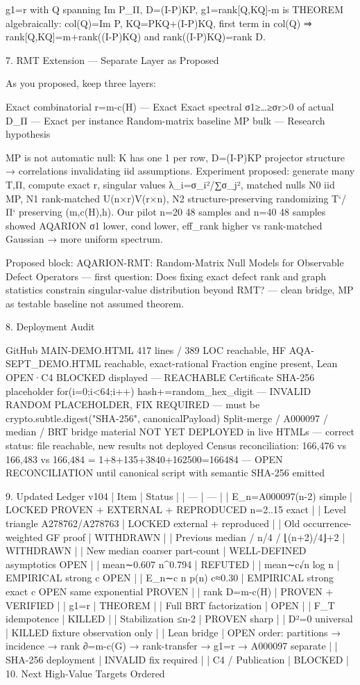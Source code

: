 g1=r with Q spanning Im P_Π, D=(I-P)KP, g1=rank[Q,KQ]-m is THEOREM algebraically: col(Q)=Im P, KQ=PKQ+(I-P)KQ, first term in col(Q) ⇒ rank[Q,KQ]=m+rank((I-P)KQ) and rank((I-P)KQ)=rank D.

7. RMT Extension — Separate Layer as Proposed

As you proposed, keep three layers:

Exact combinatorial r=m-c(H) — Exact
Exact spectral σ1≥…≥σr>0 of actual D_Π — Exact per instance
Random-matrix baseline MP bulk — Research hypothesis

MP is not automatic null: K has one 1 per row, D=(I-P)KP projector structure → correlations invalidating iid assumptions. Experiment proposed: generate many T,Π, compute exact r, singular values λ_i=σ_i²/∑σ_j², matched nulls N0 iid MP, N1 rank-matched U(n×r)V(r×n), N2 structure-preserving randomizing T`/Π` preserving (m,c(H),h). Our pilot n=20 48 samples and n=40 48 samples showed AQARION σ1 lower, cond lower, eff_rank higher vs rank-matched Gaussian → more uniform spectrum.

Proposed block: AQARION-RMT: Random-Matrix Null Models for Observable Defect Operators — first question: Does fixing exact defect rank and graph statistics constrain singular-value distribution beyond RMT? — clean bridge, MP as testable baseline not assumed theorem.

8. Deployment Audit

GitHub MAIN-DEMO.HTML 417 lines / 389 LOC reachable, HF AQA-SEPT_DEMO.HTML reachable, exact-rational Fraction engine present, Lean OPEN·C4 BLOCKED displayed — REACHABLE
Certificate SHA-256 placeholder for(i=0;i<64;i++) hash+=random_hex_digit — INVALID RANDOM PLACEHOLDER, FIX REQUIRED — must be crypto.subtle.digest("SHA-256", canonicalPayload)
Split-merge / A000097 / median / BRT bridge material NOT YET DEPLOYED in live HTMLs — correct status: file reachable, new results not deployed
Census reconciliation: 166,476 vs 166,483 vs 166,484 = 1+8+135+3840+162500=166484 — OPEN RECONCILIATION until canonical script with semantic SHA-256 emitted

9. Updated Ledger v104
| Item | Status |
| --- | --- |
| E_n=A000097(n-2) simple | LOCKED PROVEN + EXTERNAL + REPRODUCED n=2..15 exact |
| Level triangle A278762/A278763 | LOCKED external + reproduced |
| Old occurrence-weighted GF proof | WITHDRAWN |
| Previous median / n/4 / ⌊(n+2)/4⌋+2 | WITHDRAWN |
| New median coarser part-count | WELL-DEFINED asymptotics OPEN |
| mean∼0.607 n^0.794 | REFUTED |
| mean∼c√n log n | EMPIRICAL strong c OPEN |
| E_n∼c n p(n) c≈0.30 | EMPIRICAL strong exact c OPEN same exponential PROVEN |
| rank D=m-c(H) | PROVEN + VERIFIED |
| g1=r | THEOREM |
| Full BRT factorization | OPEN |
| F_T idempotence | KILLED |
| Stabilization ≤n-2 | PROVEN sharp |
| D²=0 universal | KILLED fixture observation only |
| Lean bridge | OPEN order: partitions → incidence → rank ∂=m-c(G) → rank-transfer → g1=r → A000097 separate |
| SHA-256 deployment | INVALID fix required |
| C4 / Publication | BLOCKED |
10. Next High-Value Targets Ordered


